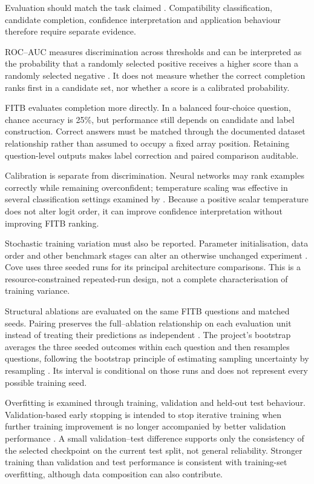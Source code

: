 Evaluation should match the task claimed \parencite{herlocker2004evaluation}.
Compatibility classification, candidate completion, confidence interpretation
and application behaviour therefore require separate evidence.

ROC--AUC measures discrimination across thresholds and can be interpreted as
the probability that a randomly selected positive receives a higher score than
a randomly selected negative \parencite{fawcett2006roc}. It does not measure
whether the correct completion ranks first in a candidate set, nor whether a
score is a calibrated probability.

FITB evaluates completion more directly. In a balanced four-choice question,
chance accuracy is 25\%, but performance still depends on candidate and label
construction. Correct answers must be matched through the documented dataset
relationship rather than assumed to occupy a fixed array position. Retaining
question-level outputs makes label correction and paired comparison auditable.

Calibration is separate from discrimination. Neural networks may rank examples
correctly while remaining overconfident; temperature scaling was effective in
several classification settings examined by \textcite{guo2017calibration}.
Because a positive scalar temperature does not alter logit order, it can improve
confidence interpretation without improving FITB ranking.

Stochastic training variation must also be reported. Parameter initialisation,
data order and other benchmark stages can alter an otherwise unchanged
experiment \parencite{bouthillier2021variance}. Cove uses three seeded runs for
its principal architecture comparisons. This is a resource-constrained
repeated-run design, not a complete characterisation of training variance.

Structural ablations are evaluated on the same FITB questions and matched
seeds. Pairing preserves the full--ablation relationship on each evaluation
unit instead of treating their predictions as independent
\parencite{dietterich1998tests}. The project's bootstrap averages the three
seeded outcomes within each question and then resamples questions, following
the bootstrap principle of estimating sampling uncertainty by resampling
\parencite{efron1994bootstrap}. Its interval is conditional on those runs and
does not represent every possible training seed.

Overfitting is examined through training, validation and held-out test
behaviour. Validation-based early stopping is intended to stop iterative
training when further training improvement is no longer accompanied by better
validation performance \parencite{prechelt1998early}. A small
validation--test difference supports only the consistency of the selected
checkpoint on the current test split, not general reliability. Stronger
training than validation and test performance is consistent with training-set
overfitting, although data composition can also contribute.

